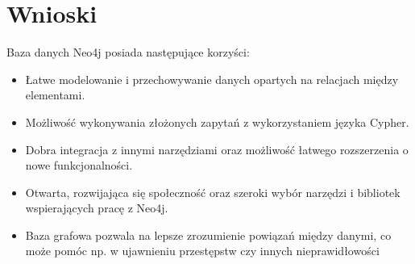 \documentclass[a4paper]{article}
\begin{document}
\section{Wnioski}

Baza danych Neo4j posiada następujące korzyści:

\begin{itemize}
\item Łatwe modelowanie i przechowywanie danych opartych na relacjach między elementami.
\item Możliwość wykonywania złożonych zapytań z wykorzystaniem języka Cypher.
\item Dobra integracja z innymi narzędziami oraz możliwość łatwego rozszerzenia 
	o nowe funkcjonalności.
\item Otwarta, rozwijająca się społeczność oraz szeroki wybór narzędzi i 
	bibliotek wspierających pracę z Neo4j.
\item Baza grafowa pozwala na lepsze zrozumienie powiązań między danymi, co może pomóc np.
	w ujawnieniu przestępstw czy innych nieprawidłowości
\end{itemize}
\end{document}
